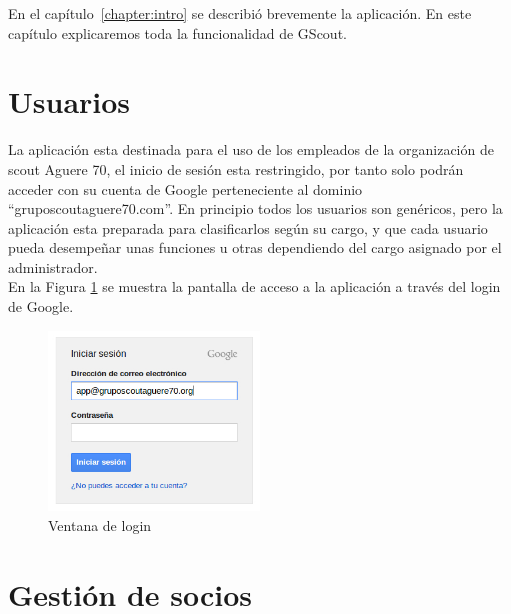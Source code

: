 
En el capítulo~\ref{chapter:intro} se describió brevemente la aplicación. En este capítulo explicaremos toda la funcionalidad de GScout.\\

\section{Usuarios}
\label{3:sec1}

La aplicación esta destinada para el uso de los empleados de la organización de scout Aguere 70, el inicio de sesión esta restringido, por tanto solo podrán 
acceder con su cuenta de Google perteneciente al dominio ``gruposcoutaguere70.com''. En principio todos los usuarios son genéricos, pero la aplicación esta preparada
para clasificarlos según su cargo, y que cada usuario pueda desempeñar unas funciones u otras dependiendo del cargo asignado por el administrador.\\

En la Figura \ref{fig:login} se muestra la pantalla de acceso a la aplicación a través del login de Google.


\begin{figure}[H]
\begin{center}
\includegraphics[width=0.5\textwidth]{images/login.jpg}
\caption{Ventana de login}
\label{fig:login}
\end{center}
\end{figure}


\section{Gestión de socios}
\label{3:sec2}

